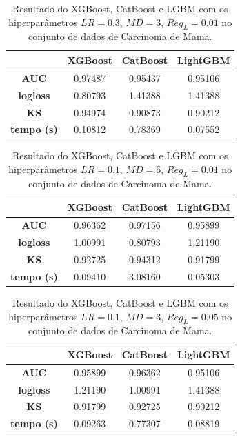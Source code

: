 \begin{table}[H]
\label{res:ren:3}
\centering
\begin{tabular}{|c|c|c|c|}
\hline
	& \textbf{XGBoost} &\textbf{CatBoost} & \textbf{LightGBM} \\
\hline
\textbf{AUC}	& 0.97487	&0.95437	&0.95106 \\
\hline
\textbf{logloss}	& 0.80793	&1.41388	&1.41388 \\
\hline
\textbf{KS}	& 0.94974	&0.90873	&0.90212 \\
\hline
\textbf{tempo (s)}	& 0.10812	&0.78369	&0.07552 \\
\hline
\end{tabular}
\caption{Resultado do XGBoost, CatBoost e LGBM com os hiperparâmetros $LR=0.3$, $MD=3$, $Reg_L=0.01$ no conjunto de dados de Carcinoma de Mama.}
\end{table}

\begin{table}[H]
\label{res:ren:4}
\centering
\begin{tabular}{|c|c|c|c|}
\hline
	& \textbf{XGBoost} &\textbf{CatBoost} & \textbf{LightGBM} \\
\hline
\textbf{AUC}	& 0.96362&	0.97156	&0.95899 \\
\hline
\textbf{logloss}	& 1.00991	&0.80793	&1.21190 \\
\hline
\textbf{KS}	&0.92725	&0.94312	&0.91799 \\
\hline
\textbf{tempo (s)}	&0.09410	&3.08160	&0.05303\\
\hline
\end{tabular}
\caption{Resultado do XGBoost, CatBoost e LGBM com os hiperparâmetros $LR=0.1$, $MD=6$, $Reg_L=0.01$ no conjunto de dados de Carcinoma de Mama.}
\end{table}

\begin{table}[H]
\label{res:ren:5}
\centering
\begin{tabular}{|c|c|c|c|}
\hline
	& \textbf{XGBoost} &\textbf{CatBoost} & \textbf{LightGBM} \\
\hline
\textbf{AUC}	&0.95899	&0.96362	&0.95106 \\
\hline
\textbf{logloss}	& 1.21190	&1.00991	&1.41388\\
\hline
\textbf{KS}	&0.91799	&0.92725	&0.90212 \\
\hline
\textbf{tempo (s)}	&0.09263	&0.77307&	0.08819 \\
\hline
\end{tabular}
\caption{Resultado do XGBoost, CatBoost e LGBM com os hiperparâmetros $LR=0.1$, $MD=3$, $Reg_L=0.05$ no conjunto de dados de Carcinoma de Mama.}
\end{table}

